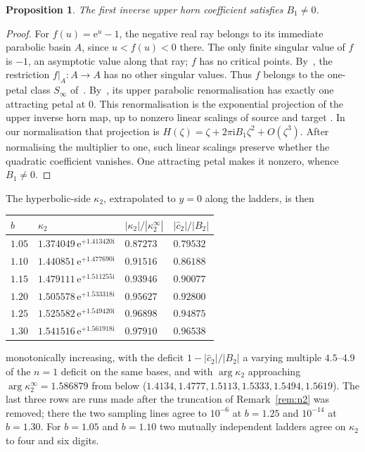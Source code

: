 \documentclass[11pt,a4paper]{article}
\newtheorem{proposition}[theorem]{Proposition}
\theoremstyle{definition}
\newcommand{\eee}{\mathrm{e}}
\newcommand{\ii}{\mathrm{i}}
\begin{document}
\begin{proposition}\label{prop:horn-nonzero}
The first inverse upper horn coefficient satisfies $B_1\ne0$.
\end{proposition}
\begin{proof}
For $f(u)=\eee^u-1$, the negative real ray belongs to its immediate
parabolic basin $A$, since $u<f(u)<0$ there.  The only finite singular
value of $f$ is $-1$, an asymptotic value along that ray; $f$ has no
critical points.  By~\cite[Lemma~87]{Cheritat2022}, the restriction
$f|_A:A\to A$ has no other singular values.  Thus $f$ belongs to the
one-petal class $S_\infty$ of~\cite[Definition~8]{Cheritat2022}.
By~\cite[Theorem~9 and Corollary~11]{Cheritat2022}, its upper parabolic
renormalisation has exactly one attracting petal at $0$.  This
renormalisation is the exponential projection of the upper inverse horn
map, up to nonzero linear scalings of source and target
\cite[Appendix~A]{Cheritat2022}.  In our normalisation that projection is
$H(\zeta)=\zeta+2\pi\ii B_1\zeta^2+O(\zeta^3)$.
After normalising the multiplier to one, such linear scalings preserve
whether the quadratic coefficient vanishes.  One attracting petal makes
it nonzero, whence $B_1\ne0$.
\end{proof}
The hyperbolic-side $\kappa_2$, extrapolated to $y=0$ along the ladders, is then

\begin{center}
\begin{tabular}{llll}
\toprule
$b$ & $\kappa_2$ & $|\kappa_2|/|\kappa_2^{\infty}|$ & $|\hat c_2|/|B_2|$\\
\midrule
$1.05$ & $1.374049\,\eee^{+1.413420\ii}$ & $0.87273$ & $0.79532$\\
$1.10$ & $1.440851\,\eee^{+1.477690\ii}$ & $0.91516$ & $0.86188$\\
$1.15$ & $1.479111\,\eee^{+1.511255\ii}$ & $0.93946$ & $0.90077$\\
$1.20$ & $1.505578\,\eee^{+1.533318\ii}$ & $0.95627$ & $0.92800$\\
$1.25$ & $1.525582\,\eee^{+1.549420\ii}$ & $0.96898$ & $0.94875$\\
$1.30$ & $1.541516\,\eee^{+1.561918\ii}$ & $0.97910$ & $0.96538$\\
\bottomrule
\end{tabular}
\end{center}

\noindent
monotonically increasing, with the deficit $1-|\hat c_2|/|B_2|$ a varying multiple
$4.5$--$4.9$ of the $n=1$ deficit on the same bases, and with $\arg\kappa_2$
approaching $\arg\kappa_2^{\infty}=1.586879$ from below
($1.4134,1.4777,1.5113,1.5333,1.5494,1.5619$).  The last three rows are runs
made after the truncation of Remark~\ref{rem:n2} was removed; there the two
sampling lines agree to $10^{-6}$ at $b=1.25$ and $10^{-14}$ at $b=1.30$.  For $b=1.05$ and $b=1.10$ two mutually independent
ladders agree on $\kappa_2$ to four and six digits.
\end{document}
